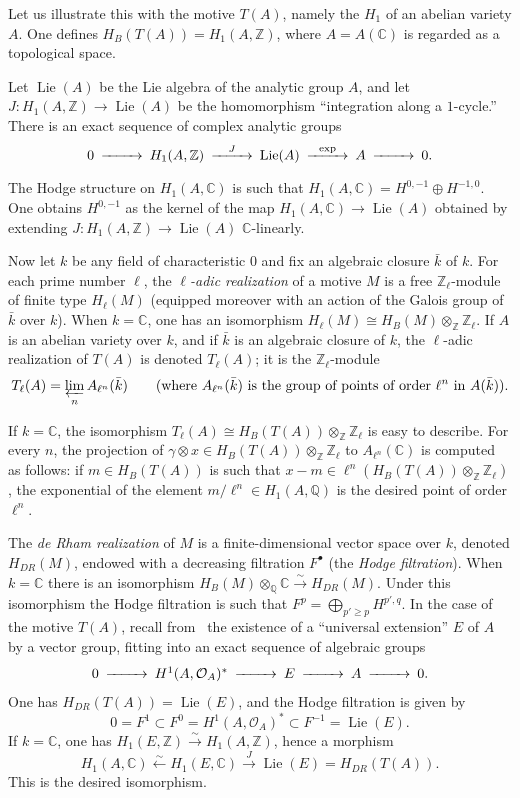 \documentclass[11pt]{amsart}
\theoremstyle{definition}
\DeclareMathOperator{\Lie}{Lie}
\newcommand{\ZZ}{\mathbb{Z}}
\newcommand{\QQ}{\mathbb{Q}}
\newcommand{\CC}{\mathbb{C}}
\begin{document}
Let us illustrate this with the motive $T(A)$, namely the $H_1$ of an abelian variety $A$. One defines $H_B(T(A))=H_1(A,\ZZ)$, where $A=A(\CC)$ is regarded as a topological space.

Let $\Lie(A)$ be the Lie algebra of the analytic group $A$, and let $J:H_1(A,\ZZ)\to \Lie(A)$ be the homomorphism ``integration along a $1$-cycle.'' There is an exact sequence of complex analytic groups
\[
\begin{CD}
0 @>>> H_1(A,\ZZ) @>{J}>> \Lie(A) @>{\exp}>> A @>>> 0.
\end{CD}
\]

The Hodge structure on $H_1(A,\CC)$ is such that $H_1(A,\CC)=H^{0,-1}\oplus H^{-1,0}$. One obtains $H^{0,-1}$ as the kernel of the map $H_1(A,\CC)\to \Lie(A)$ obtained by extending $J:H_1(A,\ZZ)\to \Lie(A)$ $\CC$-linearly.

\medskip

Now let $k$ be any field of characteristic $0$ and fix an algebraic closure $\bar{k}$ of $k$. For each prime number $\ell$, the \emph{$\ell$-adic realization} of a motive $M$ is a free $\ZZ_\ell$-module of finite type $H_\ell(M)$ (equipped moreover with an action of the Galois group of $\bar{k}$ over $k$). When $k=\CC$, one has an isomorphism $H_\ell(M)\cong H_B(M)\otimes_\ZZ \ZZ_\ell$. If $A$ is an abelian variety over $k$, and if $\bar{k}$ is an algebraic closure of $k$, the $\ell$-adic realization of $T(A)$ is denoted $T_\ell(A)$; it is the $\ZZ_\ell$-module
\[
T_\ell(A)=\varprojlim_n A_{\ell^n}(\bar{k})
\qquad\text{(where $A_{\ell^n}(\bar{k})$ is the group of points of order $\ell^n$ in $A(\bar{k})$).}
\]

If $k=\CC$, the isomorphism $T_\ell(A)\cong H_B(T(A))\otimes_\ZZ \ZZ_\ell$ is easy to describe. For every $n$, the projection of $\gamma\otimes x\in H_B(T(A))\otimes_\ZZ \ZZ_\ell$ to $A_{\ell^n}(\CC)$ is computed as follows: if $m\in H_B(T(A))$ is such that $x-m\in \ell^n(H_B(T(A))\otimes_\ZZ \ZZ_\ell)$, the exponential of the element $m/\ell^n\in H_1(A,\QQ)$ is the desired point of order $\ell^n$.

The \emph{de Rham realization} of $M$ is a finite-dimensional vector space over $k$, denoted $H_{DR}(M)$, endowed with a decreasing filtration $F^\bullet$ (the \emph{Hodge filtration}). When $k=\CC$ there is an isomorphism $H_B(M)\otimes_\QQ \CC \xrightarrow{\sim} H_{DR}(M)$. Under this isomorphism the Hodge filtration is such that $F^p=\bigoplus_{p'\ge p} H^{p',q}$. In the case of the motive $T(A)$, recall from~\cite{Weil2} the existence of a ``universal extension'' $E$ of $A$ by a vector group, fitting into an exact sequence of algebraic groups
\[
\begin{CD}
0 @>>> H^1(A,\mathcal O_A)^* @>>> E @>>> A @>>> 0.
\end{CD}
\]
One has $H_{DR}(T(A))=\Lie(E)$, and the Hodge filtration is given by
\[
0=F^1\subset F^0=H^1(A,\mathcal O_A)^*\subset F^{-1}=\Lie(E).
\]
If $k=\CC$, one has $H_1(E,\ZZ)\xrightarrow{\sim} H_1(A,\ZZ)$, hence a morphism
\[
H_1(A,\CC) \xleftarrow{\sim} H_1(E,\CC) \xrightarrow{J} \Lie(E)=H_{DR}(T(A)).
\]
This is the desired isomorphism.
\end{document}
